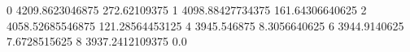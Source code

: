 0 4209.8623046875 272.62109375
1 4098.88427734375 161.64306640625
2 4058.52685546875 121.28564453125
4 3945.546875 8.3056640625
6 3944.9140625 7.6728515625
8 3937.2412109375 0.0
